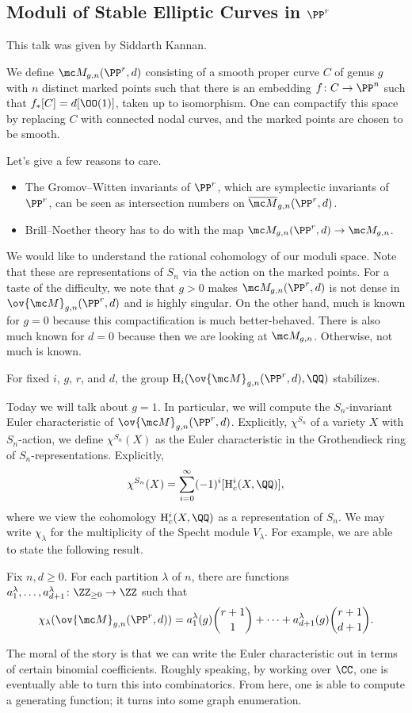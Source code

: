 \documentclass{article}
\begin{document}
\subsection{Moduli of Stable Elliptic Curves in \texorpdfstring{$\PP^r$}{ Pr}}
This talk was given by Siddarth Kannan.

We define $\mc M_{g,n}(\PP^r,d)$ consisting of a smooth proper curve $C$ of genus $g$ with $n$ distinct marked points such that there is an embedding $f\colon C\to\PP^n$ such that $f_*[C]=d[\OO(1)]$, taken up to isomorphism. One can compactify this space by replacing $C$ with connected nodal curves, and the marked points are chosen to be smooth.
\begin{remark}
	Let's give a few reasons to care.
	\begin{itemize}
		\item The Gromov--Witten invariants of $\PP^r$, which are symplectic invariants of $\PP^r$, can be seen as intersection numbers on $\overline{\mc M}_{g,n}(\PP^r,d)$.
		\item Brill--Noether theory has to do with the map $\mc M_{g,n}(\PP^r,d)\to\mc M_{g,n}$.
	\end{itemize}
\end{remark}
We would like to understand the rational cohomology of our moduli space. Note that these are representations of $S_n$ via the action on the marked points. For a taste of the difficulty, we note that $g>0$ makes $\mc M_{g,n}(\PP^r,d)$ is not dense in $\ov{\mc M}_{g,n}(\PP^r,d)$ and is highly singular. On the other hand, much is known for $g=0$ because this compactification is much better-behaved. There is also much known for $d=0$ because then we are looking at $\mc M_{g,n}$. Otherwise, not much is known.
\begin{theorem}
	For fixed $i$, $g$, $r$, and $d$, the group $\mathrm H_i(\ov{\mc M}_{g,n}(\PP^r,d),\QQ)$ stabilizes.
\end{theorem}
Today we will talk about $g=1$. In particular, we will compute the $S_n$-invariant Euler characteristic of $\ov{\mc M}_{g,n}(\PP^r,d)$. Explicitly, $\chi^{S_n}$ of a variety $X$ with $S_n$-action, we define $\chi^{S_n}(X)$ as the Euler characteristic in the Grothendieck ring of $S_n$-representations. Explicitly,
\[\chi^{S_n}(X)=\sum_{i=0}^\infty(-1)^i[\mathrm H^i_c(X,\QQ)],\]
where we view the cohomology $\mathrm H^i_c(X,\QQ)$ as a representation of $S_n$. We may write $\chi_\lambda$ for the multiplicity of the Specht module $V_\lambda$. For example, we are able to state the following result.
\begin{theorem}
	Fix $n,d\ge0$. For each partition $\lambda$ of $n$, there are functions $a_1^\lambda,\ldots,a_{d+1}^\lambda\colon\ZZ_{\ge0}\to\ZZ$ such that
	\[\chi_\lambda(\ov{\mc M}_{g,n}(\PP^r,d))=a_1^\lambda(g)\binom{r+1}1+\cdots+a_{d+1}^\lambda(g)\binom{r+1}{d+1}.\]
\end{theorem}
The moral of the story is that we can write the Euler characteristic out in terms of certain binomial coefficients. Roughly speaking, by working over $\CC$, one is eventually able to turn this into combinatorics. From here, one is able to compute a generating function; it turns into some graph enumeration.
\end{document}
